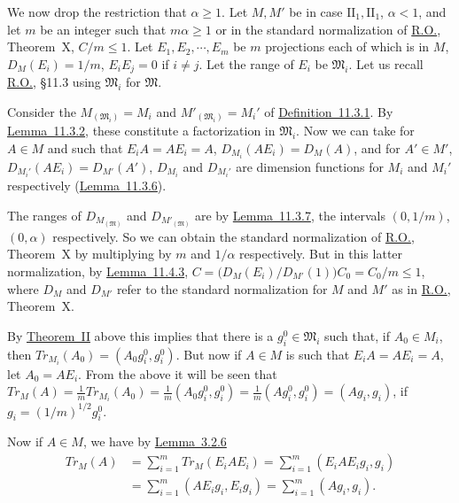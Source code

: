 \documentclass[twoside,leqno]{article}
\newcommand{\TrM}{Tr_M}
\newcommand{\RO}{\href{https://doi.org/10.2307/1968693}{R.O.}}
\newcommand{\RORef}[1]{\href{https://doi.org/10.2307/1968693}{#1}}
\newcommand{\StatementRef}[2]{\hyperlink{stmt:#1}{#2}}
\begin{document}
We now drop the restriction that $\alpha\geq1$. Let $M,M'$ be in case
$\mathrm{II}_1,\mathrm{II}_1$, $\alpha<1$, and let $m$ be an integer such
that $m\alpha\geq1$ or in the standard normalization of \RO{}, Theorem~X,
$C/m\leq1$. Let $E_1,E_2,\cdots,E_m$ be $m$ projections each of which is
in $M$, $D_M(E_i)=1/m$, $E_iE_j=0$ if $i\ne j$. Let the range of $E_i$ be
$\mathfrak M_i$. Let us recall \RO{}, \S11.3 using $\mathfrak M_i$ for
$\mathfrak M$.

Consider the $M_{(\mathfrak M_i)}=M_i$ and
$M'_{(\mathfrak M_i)}=M_i'$ of \RORef{Definition~11.3.1}. By
\RORef{Lemma~11.3.2}, these
constitute a factorization in $\mathfrak M_i$. Now we can take for $A\in M$
and such that $E_iA=AE_i=A$,
$D_{M_i}(AE_i)=D_M(A)$,
and for $A'\in M'$,
$D_{M_i'}(AE_i)=D_{M'}(A')$,
$D_{M_i}$ and $D_{M_i'}$ are dimension functions for $M_i$ and $M_i'$ 
respectively (\RORef{Lemma~11.3.6}).

The ranges of $D_{M_{(\mathfrak M)}}$ and $D_{M'_{(\mathfrak M)}}$ are by
\RORef{Lemma~11.3.7}, the intervals $(0,1/m)$, $(0,\alpha)$ respectively. So we can
obtain the standard normalization of \RO{}, Theorem~X by multiplying by
$m$ and $1/\alpha$ respectively. But in this latter normalization, by
\RORef{Lemma~11.4.3},
$C=\bigl(D_M(E_i)/D_{M'}(1)\bigr)C_0=C_0/m\leq1$,
where $D_M$ and $D_{M'}$ refer to the standard normalization for $M$ and
$M'$ as in \RO{}, Theorem~X.

By \StatementRef{theorem:II}{Theorem~II} above this implies that there is a
$g_i^0\in\mathfrak M_i$ such that, if $A_0\in M_i$, then
$Tr_{M_i}(A_0)=(A_0g_i^0,g_i^0)$. 
But now if $A\in M$ is such that $E_iA=AE_i=A$, let $A_0=AE_i$. From the
above it will be seen that
$\TrM(A)=\frac1mTr_{M_i}(A_0)=\frac1m(A_0g_i^0,g_i^0)
=\frac1m(Ag_i^0,g_i^0)=(Ag_i,g_i)$, if $g_i=(1/m)^{1/2}g_i^0$.

Now if $A\in M$, we have by \StatementRef{lemma:3.3.5}{Lemma~3.2.6}
\begin{align*}
 \TrM(A)
 &=\sum_{i=1}^m\TrM(E_iAE_i)
 =\sum_{i=1}^m(E_iAE_ig_i,g_i)\\
 &=\sum_{i=1}^m(AE_ig_i,E_ig_i)
 =\sum_{i=1}^m(Ag_i,g_i).
\end{align*}
\end{document}

